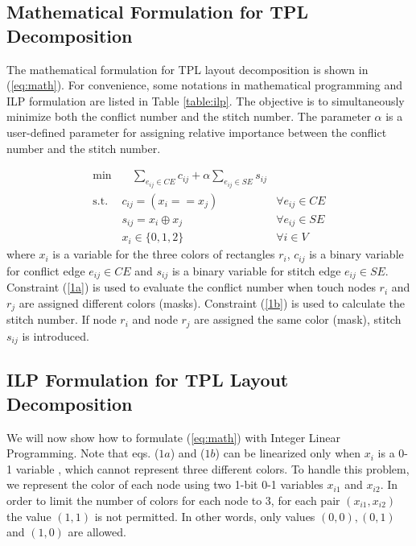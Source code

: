\documentclass[10pt,conference]{IEEEtran}
\begin{document}
\subsection{Mathematical Formulation for TPL Decomposition}

The mathematical formulation for TPL layout decomposition is shown in (\ref{eq:math}).
For convenience, some notations in mathematical programming and ILP formulation are listed in Table \ref{table:ilp}.
The objective is to simultaneously minimize both the conflict number and the stitch number.
The parameter $\alpha$ is a user-defined parameter for assigning relative importance between the conflict number and the stitch number.

\begin{align}
    \label{eq:math}
    \textrm{min}  	&     \ \ \ \  \sum_{e_{ij} \in CE} c_{ij} + \alpha \sum_{e_{ij} \in SE}s_{ij}& \\
    \textrm{s.t}.\ \ 	& c_{ij} = ( x_i == x_j )	&\forall e_{ij} \in CE		\label{1a}\tag{$1a$}\\
            		& s_{ij} = x_i \oplus x_j	&\forall e_{ij} \in SE		\label{1b}\tag{$1b$}\\
            		& x_i \in \{0, 1, 2\}		& \forall i \in V		\label{1c}\tag{$1c$}
\end{align}
where $x_i$ is a variable for the three colors of rectangles $r_i$, $c_{ij}$ is a binary variable for conflict edge $e_{ij} \in CE$ and $s_{ij}$ is a binary variable for  stitch edge $e_{ij} \in SE$. 
Constraint (\ref{1a}) is used to evaluate the conflict number when touch nodes $r_i$ and $r_j$ are assigned different colors (masks). Constraint (\ref{1b}) is used to calculate the stitch number. If node $r_i$ and node $r_j$ are assigned the same color (mask), stitch $s_{ij}$ is introduced.



\subsection{ILP Formulation for TPL Layout Decomposition}

We will now show how to formulate (\ref{eq:math}) with Integer Linear Programming.
Note that  eqs. ($1a$) and ($1b$) can be linearized only when $x_i$ is a 0-1 variable \cite{DPL_ICCAD08_Kahng}, which cannot represent three different colors. To handle this problem, we represent the color of each node using two 1-bit 0-1 variables $x_{i1}$ and $x_{i2}$.
In order to limit the number of colors for each node to 3, for each pair $(x_{i1}, x_{i2})$ the value $(1, 1)$ is not permitted.
In other words, only values $(0, 0), (0, 1)$ and $(1, 0)$ are allowed.
\end{document}
